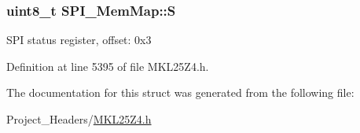 \subsubsection[{\texorpdfstring{S}{S}}]{\setlength{\rightskip}{0pt plus 5cm}uint8\+\_\+t S\+P\+I\+\_\+\+Mem\+Map\+::S}\hypertarget{struct_s_p_i___mem_map_ad905fa29c8b2f0ca5b93222e7961542b}{}\label{struct_s_p_i___mem_map_ad905fa29c8b2f0ca5b93222e7961542b}
S\+PI status register, offset\+: 0x3 

Definition at line 5395 of file M\+K\+L25\+Z4.\+h.



The documentation for this struct was generated from the following file\+:\begin{DoxyCompactItemize}
\item 
Project\+\_\+\+Headers/\hyperlink{_m_k_l25_z4_8h}{M\+K\+L25\+Z4.\+h}\end{DoxyCompactItemize}
